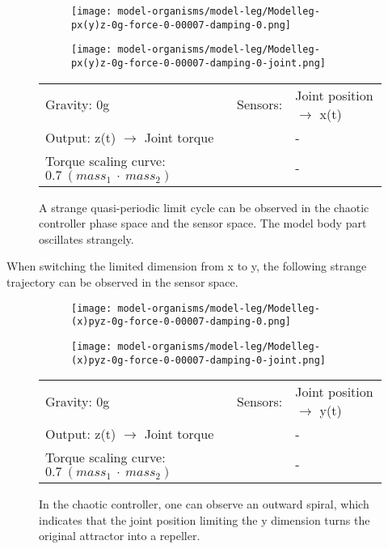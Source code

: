 \documentclass[main]{subfiles}
\begin{document}
\begin{figure}[H]
	\centering
		\begin{subfigure}[c]{0.45\textwidth}
	\texttt{[image: model-organisms/model-leg/Modelleg-px(y)z-0g-force-0-00007-damping-0.png]}
		\end{subfigure}
	\begin{subfigure}[c]{0.45\textwidth}
	\texttt{[image: model-organisms/model-leg/Modelleg-px(y)z-0g-force-0-00007-damping-0-joint.png]}
		\end{subfigure}
	\caption[Joint position \(\rightarrow\) x(t) limited chaotic controller controlling model leg.]{A strange quasi-periodic limit cycle can be observed in the chaotic controller phase space and the sensor space. The model body part oscillates strangely.}
	\begin{tabular}{l|ll}
	\hline 
	Gravity: 0g  & Sensors: & Joint position \(\rightarrow\) x(t)\\
	 Output: z(t) \(\rightarrow\) Joint torque & & - \\
	  Torque scaling curve: \(0.7~(mass_1~\cdot~mass_2)\) & & - \\
	  \hline
	\end{tabular}
	\label{figure:limited-model-leg1}
\end{figure}

When switching the limited dimension from x to y, the following strange trajectory can be observed in the sensor space.

\begin{figure}[H]
	\centering
		\begin{subfigure}[c]{0.45\textwidth}
	\texttt{[image: model-organisms/model-leg/Modelleg-(x)pyz-0g-force-0-00007-damping-0.png]}
		\end{subfigure}
	\begin{subfigure}[c]{0.45\textwidth}
	\texttt{[image: model-organisms/model-leg/Modelleg-(x)pyz-0g-force-0-00007-damping-0-joint.png]}
		\end{subfigure}
	\caption[Joint position \(\rightarrow\) y(t) limited chaotic controller controlling model leg]{In the chaotic controller, one can observe an outward spiral, which indicates that the joint position limiting the y dimension turns the original attractor into a repeller.}
	\begin{tabular}{l|ll}
	\hline 
	Gravity: 0g  & Sensors: & Joint position \(\rightarrow\) y(t)\\
	 Output: z(t) \(\rightarrow\) Joint torque & & - \\
	  Torque scaling curve: \(0.7~(mass_1~\cdot~mass_2)\) & & - \\
	  \hline
	\end{tabular}

	\label{figure:limited-model-leg2}
\end{figure}
\end{document}
